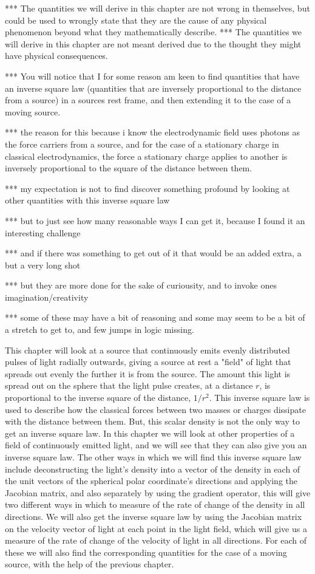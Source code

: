 *** The quantities we will derive in this chapter are not wrong in themselves, but could be used to wrongly state that they are the cause of any physical phenomenon beyond what they mathematically describe.
*** The quantities we will derive in this chapter are not meant derived due to the thought they might have physical consequences.

*** You will notice that I for some reason am keen to find quantities that have an inverse square law (quantities that are inversely proportional to the distance from a source) in a sources rest frame, and then extending it to the case of a moving source.

*** the reason for this because i know the electrodynamic field uses photons as the force carriers from a source, and for the case of a stationary charge in classical electrodynamics, the force a stationary charge applies to another is inversely proportional to the square of the distance between them.

*** my expectation is not to find discover something profound by looking at other quantities with this inverse square law

*** but to just see how many reasonable ways I can get it, because I found it an interesting challenge

*** and if there was something to get out of it that would be an added extra, a but a very long shot

*** but they are more done for the sake of curiousity, and to invoke ones imagination/creativity

*** some of these may have a bit of reasoning and some may seem to be a bit of a stretch to get to, and few jumps in logic missing.

This chapter will look at a source that continuously emits evenly distributed pulses of light radially outwards, giving a source at rest a "field" of light that spreads out evenly the further it is from the source.
The amount this light is spread out on the sphere that the light pulse creates, at a distance $r$, is proportional to the inverse square of the distance, $1/r^2$.
This inverse square law is used to describe how the classical forces between two masses or charges dissipate with the distance between them.
But, this scalar density is not the only way to get an inverse square law.
In this chapter we will look at other properties of a field of continuously emitted light, and we will see that they can also give you an inverse square law.
The other ways in which we will find this inverse square law include deconstructing the light's density into a vector of the density in each of the unit vectors of the spherical polar coordinate's directions and applying the Jacobian matrix, and also separately by using the gradient operator, this will give two different ways in which to measure of the rate of change of the density in all directions.
We will also get the inverse square law by using the Jacobian matrix on the velocity vector of light at each point in the light field, which will give us a measure of the rate of change of the velocity of light in all directions.
For each of these we will also find the corresponding quantities for the case of a moving source, with the help of the previous chapter.

